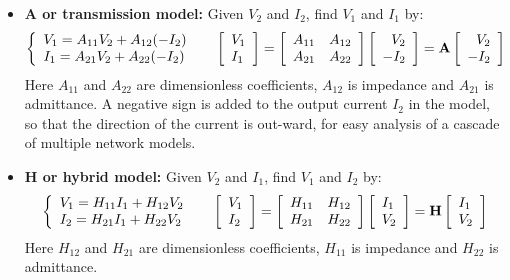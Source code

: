 \begin{itemize}
\begin{itemize}
\item {\bf A or transmission model:} Given $V_2$ and $I_2$, find 
  $V_1$ and $I_1$ by:
  \[\left\{ \begin{array}{l} 
    V_1=A_{11}V_2+A_{12}(-I_2) \\
    I_1=A_{21}V_2+A_{22}(-I_2) \end{array} \right.\;\;\;\;\;
  \left[ \begin{array}{l} V_1 \\ I_1\end{array} \right]=
  \left[ \begin{array}{ll} A_{11} & A_{12}\\A_{21} & A_{22}\end{array}\right]
  \left[ \begin{array}{r} V_2 \\ -I_2\end{array} \right]
  ={\bf A}\left[ \begin{array}{r} V_2 \\ -I_2\end{array} \right]  \]
  Here $A_{11}$ and $A_{22}$ are dimensionless coefficients, $A_{12}$ is impedance 
  and $A_{21}$ is admittance. A negative sign is added to the output current $I_2$ 
  in the model, so that the direction of the current is out-ward, for easy
  analysis of a cascade of multiple network models.

\item {\bf H or hybrid model:} Given $V_2$ and $I_1$, find $V_1$ and $I_2$ by:
  \[\left\{ \begin{array}{l} 
    V_1=H_{11}I_1+H_{12}V_2 \\
    I_2=H_{21}I_1+H_{22}V_2 \end{array} \right.\;\;\;\;\;
  \left[ \begin{array}{l} V_1 \\ I_2\end{array} \right]=
  \left[ \begin{array}{ll} H_{11} & H_{12}\\H_{21} & H_{22}\end{array}\right]
  \left[ \begin{array}{l} I_1 \\ V_2\end{array} \right]
  ={\bf H}\left[ \begin{array}{l} I_1 \\ V_2\end{array} \right]  \]
  Here $H_{12}$ and $H_{21}$ are dimensionless coefficients, $H_{11}$ is impedance
  and $H_{22}$ is admittance. 


\end{itemize}
\end{itemize}
